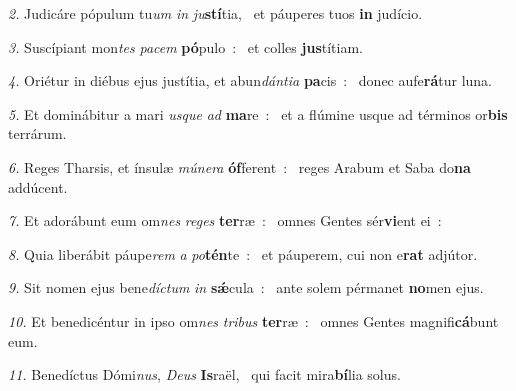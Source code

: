\begin{psalmus}
\textit{\color{red}2.} Judicáre pópulum tu\textit{um} \textit{in} \textit{ju}\textbf{stí}tia,~\grestar{}
et páuperes tuos \textbf{in} judício. \Abardot{}

\textit{\color{red}3.} Suscípiant mon\textit{tes} \textit{pa}\textit{cem} \textbf{pó}pulo~:~\grestar{}
et colles \textbf{jus}títiam. \Abardot{}

\textit{\color{red}4.} Oriétur in diébus ejus justítia, et abun\textit{dán}\textit{ti}\textit{a} \textbf{pa}cis~:~\grestar{}
donec aufe\textbf{rá}tur luna. \Abardot{}

\textit{\color{red}5.} Et dominábitur a mari \textit{us}\textit{que} \textit{ad} \textbf{ma}re~:~\grestar{}
et a flúmine usque ad términos or\textbf{bis} terrárum. \Abardot{}

\textit{\color{red}6.} Reges Tharsis, et ínsulæ \textit{mú}\textit{ne}\textit{ra} \textbf{óf}ferent~:~\grestar{}
reges Arabum et Saba do\textbf{na} addúcent. \Abardot{}

\textit{\color{red}7.} Et adorábunt eum om\textit{nes} \textit{re}\textit{ges} \textbf{ter}ræ~:~\grestar{}
omnes Gentes sér\textbf{vi}ent ei~: \Abardot{}

\textit{\color{red}8.} Quia liberábit páupe\textit{rem} \textit{a} \textit{po}\textbf{tén}te~:~\grestar{}
et páuperem, cui non e\textbf{rat} adjútor. \Abardot{}

\textit{\color{red}9.} Sit nomen ejus bene\textit{dí}\textit{ctum} \textit{in} \textbf{sǽ}cula~:~\grestar{}
ante solem pérmanet \textbf{no}men ejus. \Abardot{}

\textit{\color{red}10.} Et benedicéntur in ipso om\textit{nes} \textit{tri}\textit{bus} \textbf{ter}ræ~:~\grestar{}
omnes Gentes magnifi\textbf{cá}bunt eum. \Abardot{}

\textit{\color{red}11.} Benedíctus Dómi\textit{nus}, \textit{De}\textit{us} \textbf{Is}raël,~\grestar{}
qui facit mira\textbf{bí}lia solus. \Abardot{}
\end{psalmus}
